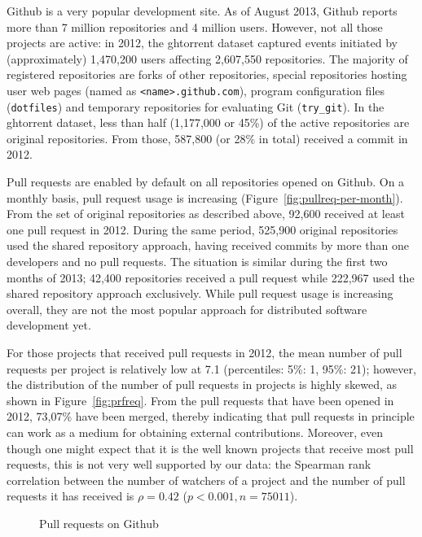 \documentclass{sig-alternate}
\begin{document}
Github is a very popular development site. As of August 2013, Github reports
more than 7 million repositories and 4 million users. However, not all those
projects are active: in 2012, the {\sc ght}orrent dataset captured events initiated by
(approximately) 1,470,200 users affecting 2,607,550 repositories. The majority
of registered repositories are forks of other repositories, special repositories
hosting user web pages (named as \texttt{<name>.github.com}), program
configuration files (\texttt{dotfiles}) and temporary repositories for
evaluating Git (\texttt{try\_git}). In the {\sc ght}orrent dataset, less than half
(1,177,000 or 45\%) of the active repositories are original repositories. From
those, 587,800 (or 28\% in total) received a commit in 2012.

Pull requests are enabled by default on all repositories opened on Github. On a
monthly basis, pull request usage is increasing
(Figure~\ref{fig:pullreq-per-month}). From the set of original repositories as
described above, 92,600 received at least one pull request in 2012. During the
same period, 525,900 original repositories used the shared repository approach,
having received commits by more than one developers and no pull requests. The
situation is similar during the first two months of 2013; 42,400 repositories
received a pull request while 222,967 used the shared repository approach
exclusively. While pull request usage is increasing overall, they are not the
most popular approach for distributed software development yet.

For those projects that received pull requests in 2012, the mean number of pull
requests per project is relatively low at 7.1 (percentiles: 5\%: 1, 95\%: 21);
however, the distribution of the number of pull requests in projects is highly skewed, as
shown in Figure~\ref{fig:prfreq}.
From the pull requests that have been opened in 2012, 73,07\% have been merged,
thereby indicating that pull requests in principle can work as a medium for
obtaining external contributions. Moreover, even though one might expect that it
is the well known projects that receive most pull requests, this is not very
well supported by our data: the Spearman rank correlation between the number of
watchers of a project and the number of pull requests it has received is $\rho = 0.42$
($p < 0.001, n = 75011$).

\begin{figure}[t]
  \centering
{}
\caption{Pull requests on Github}
\end{figure}
\end{document}
